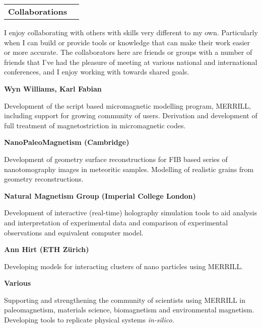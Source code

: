 \documentclass[11pt]{article}
\makeatletter
\newenvironment{resumeSubSectionHeader}{
    \par
    \begin{tabular*}{\textwidth}{l@{\extracolsep{\fill}}r}
    \par
} {
    \end{tabular*}
    \par
}
\newenvironment{resumeSubSectionBody}{
    \par
    \vspace{-0.8\parskip}
    \begin{small}
    \par
} {
    \par
    \end{small}
    \par
}
\makeatother
\begin{document}
%
%
\begin{resumeSubSectionHeader}

    \textbf{Collaborations}

\end{resumeSubSectionHeader}
\begin{resumeSubSectionBody}

    I enjoy collaborating with others with skills very different to my own.
    Particularly when I can build or provide tools or knowledge that can make
    their work easier or more accurate.
    The collaborators here are friends or groups with a number of friends that
    I've had the pleasure of meeting at various national and international
    conferences, and I enjoy working with towards shared goals.

    \begin{description}

        \item{\bf Wyn Williams, Karl Fabian}

            Development of the script based micromagnetic modelling program,
            MERRILL, including support for growing community of users.
            Derivation and development of full treatment of magnetostriction in
            micromagnetic codes.

        \item{\bf NanoPaleoMagnetism (Cambridge)}

            Development of geometry surface reconstructions for FIB based series of
            nanotomography images in meteoritic samples.
            Modelling of realistic grains from geometry reconstructions.

        \item{\bf Natural Magnetism Group (Imperial College London)}

            Development of interactive (real-time) holography simulation tools to
            aid analysis and interpretation of experimental data and comparison of
            experimental observations and equivalent computer model.

        \item{\bf Ann Hirt (ETH Z\"urich)}

            Developing models for interacting clusters of nano particles using
            MERRILL.

        \item{\bf Various}

            Supporting and strengthening the community of scientists using MERRILL
            in paleomagnetism, materials science, biomagnetism and environmental
            magnetism.
            Developing tools to replicate physical systems {\it in-silico}.

    \end{description}

\end{resumeSubSectionBody}



\end{document}
